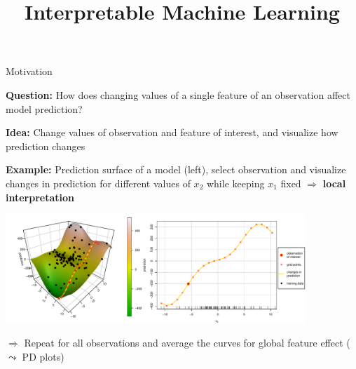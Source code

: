 \documentclass[11pt,compress,t,notes=noshow, aspectratio=169, xcolor=table]{beamer}
\title{Interpretable Machine Learning}
\date{}
\begin{document}
\newcommand{\titlefigure}{figure/feature-effect}
\newcommand{\learninggoals}{
\item ICE curves
}



\begin{frame}{Motivation}

\textbf{Question:} How does changing values of a single feature of an observation affect model prediction?

\smallskip

\textbf{Idea:} Change values of observation and feature of interest, and visualize how prediction changes

\smallskip

\textbf{Example:} Prediction surface of a model (left), select observation and visualize changes in prediction for different values of $x_2$ while keeping $x_1$ fixed $\Rightarrow$ \textbf{local interpretation}

\centering
\includegraphics[width=0.85\textwidth]{figure/ice_motivation}

$\Rightarrow$ Repeat for all observations and average the curves for global feature effect ($\leadsto$ PD plots)
\end{frame}
\end{document}
